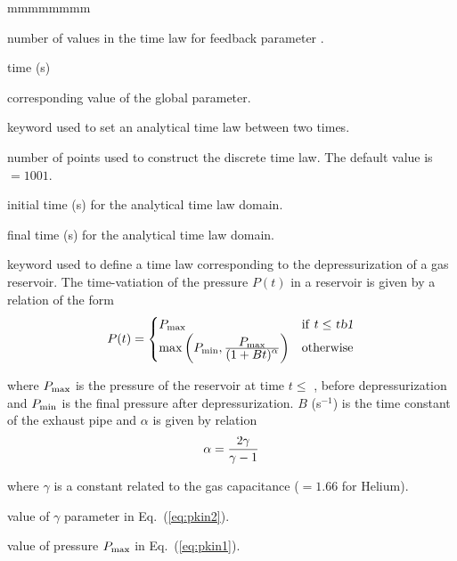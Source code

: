 \begin{ListeDeDescription}{mmmmmmmm}
\item[\dusa{ntime}] number of values in the time law for feedback parameter .

\item[\dusa{t}] time (s)

\item[\dusa{x}] corresponding value of the global parameter.

\item[\moc{T-DELT}] keyword used to set an analytical time law between two times.

\item[\dusa{nxy}] number of points used to construct the discrete time law. The default value is  $=1001$.

\item[\dusa{t1}] initial time (s) for the analytical time law domain.

\item[\dusa{t2}] final time (s) for the analytical time law domain.

\item[\moc{P-VALV}] keyword used to define a time law corresponding to the depressurization of a gas reservoir. The time-vatiation of the pressure $P(t)$ in a
reservoir is given by a relation of the form
\begin{equation}
P(t)=\begin{cases} P_{\rm max} & {\rm if} \ t \le {\rm \dusa{tb1}}\\
\max{\left(P_{\rm min},{\displaystyle P_{\rm max}\over\displaystyle (1+Bt)^\alpha}\right)} & {\rm otherwise}\end{cases}
\label{eq:pkin1}
\end{equation}

\noindent where $P_{\rm max}$ is the pressure of the reservoir at time $t\le$ , before depressurization and $P_{\rm min}$ is the final pressure after
depressurization. $B$ (s$^{-1}$) is the time constant of the exhaust pipe and $\alpha$ is given by relation
\begin{equation}
\alpha={2\gamma\over \gamma-1}
\label{eq:pkin2}
\end{equation}

\noindent where $\gamma$ is a constant related to the gas capacitance ($=1.66$ for Helium).

\item[\dusa{gamma}] value of $\gamma$ parameter in Eq.~(\ref{eq:pkin2}).

\item[\dusa{p1}] value of pressure $P_{\rm max}$ in Eq.~(\ref{eq:pkin1}).


\end{ListeDeDescription}
